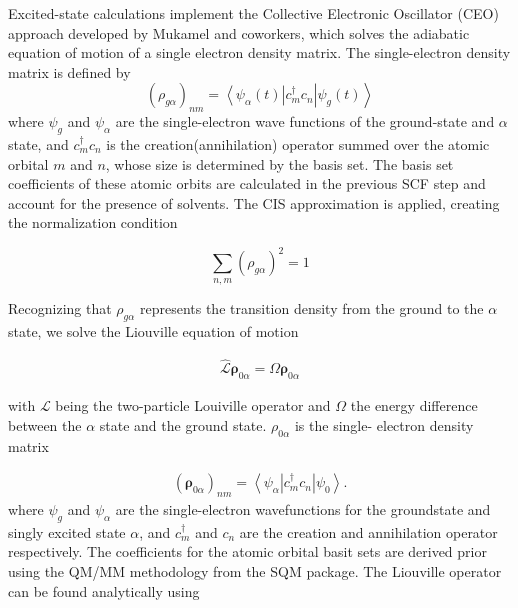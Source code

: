 Excited-state calculations implement the Collective Electronic Oscillator (CEO) approach developed by Mukamel and coworkers, which solves the adiabatic equation of motion of a single electron density matrix.\cite{Mukamel1997,tretiak02_densit_matrix_analy_simul_elect}
The single-electron density matrix is defined by
\begin{equation}
  (\rho_{g\alpha})_{nm} = \left< \psi_{\alpha} (t) \right| c_m^{\dagger} c_n \left| \psi_{g} (t) \right>
\end{equation}
where \(\psi_g\) and \(\psi_\alpha\) are the single-electron wave functions of the ground-state and \(\alpha\) state, and \(c_m^{\dagger} c_n\) is the creation(annihilation) operator summed over the atomic orbital \(m\) and \(n\), whose size is determined by the basis set.
The basis set coefficients of these atomic orbits are calculated in the previous SCF step and account for the presence of solvents.
The CIS approximation is applied, creating the normalization condition 

\begin{equation}
  \sum_{n,m} (\rho_{g\alpha})^2 = 1
\end{equation}

Recognizing that \(\rho_{g\alpha}\) represents the transition density from the ground to the \(\alpha\) state, we solve the Liouville equation of motion 

\begin{align*}
  \hat{\mathbf{\mathcal{L}}}\mathbf{\rho}_{0\alpha} = \Omega\mathbf{\rho}_{0\alpha}
\end{align*}


with \(\mathbf{\mathcal{L}}\) being the two-particle Louiville operator and
\(\Omega\) the energy difference between the \(\alpha\) state and the ground
state. \(\rho_{0\alpha}\) is the single- electron density matrix

\begin{align*}
  (\mathbf{\rho}_{0\alpha})_{nm} =  \left< \psi_{\alpha} \right| c_m^\dagger c_n \left| \psi_0 \right>.
\end{align*}
where \(\psi_{g}\) and \(\psi_{\alpha}\) are the single-electron wavefunctions for the groundstate and singly excited state \(\alpha\), and
\(c_m^\dagger\) and \(c_n\) are the creation and annihilation operator respectively. The coefficients for the atomic orbital basit sets are derived prior using the QM/MM methodology from the SQM package.\cite{Walker2008} The Liouville operator can be found analytically using 

